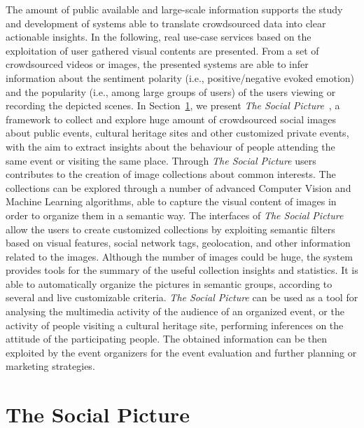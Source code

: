 The amount of public available and large-scale information supports the study and development of systems able to translate crowdsourced data into clear actionable insights.
In the following, real use-case services based on the exploitation of user gathered visual contents are presented. From a set of crowdsourced videos or images, the presented systems are able to infer information about the sentiment polarity (i.e., positive/negative evoked emotion) and the popularity (i.e.,  among large groups of users) of the users viewing or recording the depicted scenes.
In Section~\ref{TSP}, we present \textit{The Social Picture}~\cite{battiato2016social}, a framework to collect and explore huge amount of crowdsourced social images about public events, cultural heritage sites and other customized private events, with the aim to extract insights about the behaviour of people attending the same event or visiting the same place. 
Through \textit{The Social Picture} users contributes to the creation of image collections about common interests. %
The collections can be explored through a number of advanced Computer Vision and Machine Learning algorithms, able to capture the visual content of images in order to organize them in a semantic way. The interfaces of \textit{The Social Picture} allow the users to create customized collections by exploiting semantic filters based on visual features, social network tags, geolocation, and other information related to the images.
Although the number of images could be huge, the system provides tools for the summary of the useful collection insights and statistics. It is able to automatically organize the pictures in semantic groups, according to several and live customizable criteria.
\textit{The Social Picture} can be used as a tool for analysing the multimedia activity of the audience of an organized event, or the activity of people visiting a cultural heritage site, performing inferences on the attitude of the participating people. The obtained information can be then exploited by the event organizers for the event evaluation and further planning or marketing strategies.


\section{The Social Picture}\label{TSP}
